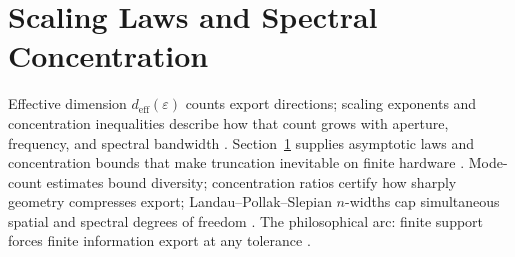 \section{Scaling Laws and Spectral Concentration}
\label{sec:ch48}

Effective dimension \(d_{\mathrm{eff}}(\varepsilon)\) counts export directions; scaling exponents and concentration inequalities describe how that
count grows with aperture, frequency, and spectral bandwidth \cite{stratton1941,jackson1999,hansen1988,harrington2001}. Section~\ref{sec:ch48}
supplies asymptotic laws and concentration bounds that make truncation inevitable on finite hardware \cite{devaney2004}. Mode-count estimates bound
diversity; concentration ratios certify how sharply geometry compresses export; Landau--Pollak--Slepian \(n\)-widths cap simultaneous spatial and
spectral degrees of freedom \cite{hansen1988,stratton1941}. The philosophical arc: finite support forces finite information export at any tolerance
\cite{harrington2001,jackson1999}.

